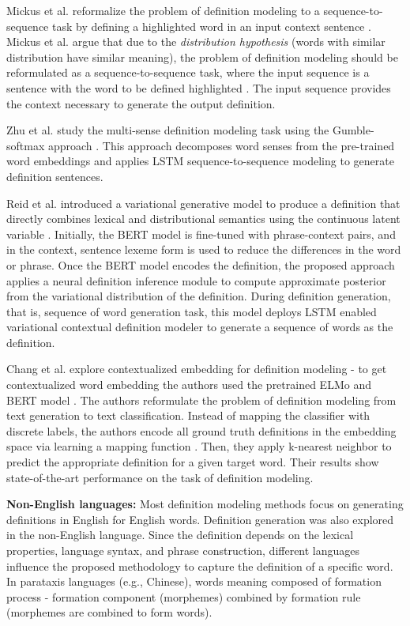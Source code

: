 Mickus et al. reformalize the problem of definition modeling to a
sequence-to-sequence task by defining a highlighted word in an input context
sentence \cite{mickus_mark_2019}. Mickus et al. argue that due to the
\textit{distribution hypothesis} (words with similar distribution have similar
meaning), the problem of definition modeling should be reformulated as a
sequence-to-sequence task, where the input sequence is a sentence with the word
to be defined highlighted \cite{mickus_mark_2019}. The input sequence provides
the context necessary to generate the output definition.

Zhu et al. study the multi-sense definition modeling task using the
Gumble-softmax approach \cite{zhu_multi_2019}. This approach decomposes word
senses from the pre-trained word embeddings and applies LSTM
sequence-to-sequence modeling to generate definition sentences.

Reid et al. introduced a variational generative model to produce a definition
that directly combines lexical and distributional semantics using the continuous
latent variable \cite{reid_vcdm_2020}. Initially, the BERT model is fine-tuned
with phrase-context pairs, and in the context, sentence lexeme form is used to
reduce the differences in the word or phrase. Once the BERT model encodes the
definition, the proposed approach applies a neural definition inference module
to compute approximate posterior from the variational distribution of the
definition. During definition generation, that is, sequence of word generation
task, this model deploys LSTM enabled variational contextual definition modeler
to generate a sequence of words as the definition.

Chang et al. explore contextualized embedding for definition modeling - to get
contextualized word embedding the authors used the pretrained ELMo and BERT
model \cite{chang_what_2019}. The authors reformulate the problem of definition
modeling from text generation to text classification. Instead of mapping the
classifier with discrete labels, the authors encode all ground truth definitions
in the embedding space via learning a mapping function \cite{chang_what_2019}.
Then, they apply k-nearest neighbor to predict the appropriate definition for a
given target word. Their results show state-of-the-art performance on the task
of definition modeling.

\textbf{Non-English languages:}
Most definition modeling methods focus on generating definitions in English for
English words. Definition generation was also explored in the non-English
language. Since the definition depends on the lexical properties, language
syntax, and phrase construction, different languages influence the proposed
methodology to capture the definition of a specific word. In parataxis languages
(e.g., Chinese), words meaning composed of formation process - formation
component (morphemes) combined by formation rule (morphemes are combined to form
words).

